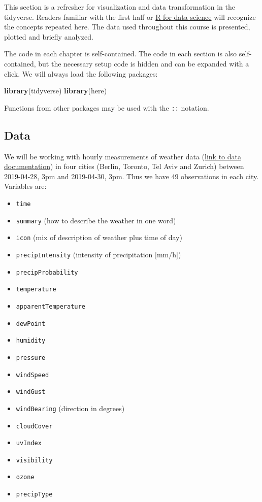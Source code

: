 \documentclass[]{book}
\newenvironment{Shaded}{\begin{snugshade}}{\end{snugshade}}
\newcommand{\KeywordTok}[1]{\textcolor[rgb]{0.13,0.29,0.53}{\textbf{#1}}}
\newcommand{\NormalTok}[1]{#1}
\providecommand{\tightlist}{%
  \setlength{\itemsep}{0pt}\setlength{\parskip}{0pt}}
\begin{document}
This section is a refresher for visualization and data transformation in the tidyverse.
Readers familiar with the first half or \href{https://r4ds.had.co.nz/}{R for data science} will recognize the concepts repeated here.
The data used throughout this course is presented, plotted and briefly analyzed.

The code in each chapter is self-contained.
The code in each section is also self-contained, but the necessary setup code is hidden and can be expanded with a click.
We will always load the following packages:

\begin{Shaded}
\begin{Highlighting}[]
\KeywordTok{library}\NormalTok{(tidyverse)}
\KeywordTok{library}\NormalTok{(here)}
\end{Highlighting}
\end{Shaded}

Functions from other packages may be used with the \texttt{::} notation.

\hypertarget{intro-data}{%
\subsection{Data}\label{intro-data}}

We will be working with hourly measurements of weather data (\href{https://darksky.net/dev/docs}{link to data documentation}) in four cities (Berlin, Toronto, Tel Aviv and Zurich) between 2019-04-28, 3pm and 2019-04-30, 3pm.
Thus we have 49 observations in each city.
Variables are:

\begin{itemize}
\tightlist
\item
  \texttt{time}
\item
  \texttt{summary} (how to describe the weather in one word)
\item
  \texttt{icon} (mix of description of weather plus time of day)
\item
  \texttt{precipIntensity} (intensity of precipitation {[}mm/h{]})
\item
  \texttt{precipProbability}
\item
  \texttt{temperature}
\item
  \texttt{apparentTemperature}
\item
  \texttt{dewPoint}
\item
  \texttt{humidity}
\item
  \texttt{pressure}
\item
  \texttt{windSpeed}
\item
  \texttt{windGust}
\item
  \texttt{windBearing} (direction in degrees)
\item
  \texttt{cloudCover}
\item
  \texttt{uvIndex}
\item
  \texttt{visibility}
\item
  \texttt{ozone}
\item
  \texttt{precipType}
\end{itemize}
\end{document}
